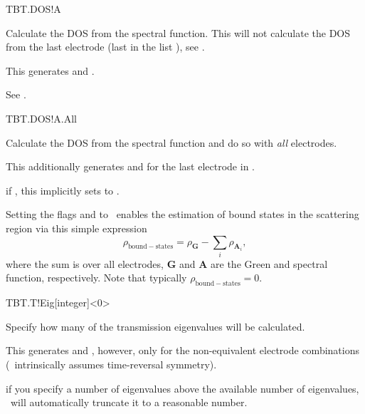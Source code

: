 \begin{fdflogicalF}{TBT.DOS!A}

  Calculate the DOS from the spectral function. This will not
  calculate the DOS from the last electrode (last in the list
  ), see . 

  This generates  and .

  See .

\end{fdflogicalF}

\begin{fdflogicalF}{TBT.DOS!A.All}

  Calculate the DOS from the spectral function and do so with
  \emph{all} electrodes.

  This additionally generates  and
   for the last electrode in .

  \note if \fdftrue, this implicitly sets  to \fdftrue.

\end{fdflogicalF}

Setting the flags  and  to
\fdftrue\ enables the estimation of bound states in the scattering
region via this simple expression
\begin{equation}
  \rho_{\mathrm{bound-states}} = \rho_{\mathbf G} - 
  \sum_i \rho_{\mathbf A_i},
\end{equation}
where the sum is over all electrodes, $\mathbf G$ and $\mathbf A$ are
the Green and spectral function, respectively. Note that typically
$\rho_{\mathrm{bound-states}}=0$. 

\begin{fdfentry}{TBT.T!Eig}[integer]<0>

  Specify how many of the transmission eigenvalues will be
  calculated. 

  This generates  and
  , however, only for the non-equivalent
  electrode combinations (\tbtrans\ intrinsically assumes
  time-reversal symmetry).

  \note if you specify a number of eigenvalues above the available
  number of eigenvalues, \tbtrans\ will automatically truncate it to a
  reasonable number.

\end{fdfentry}

